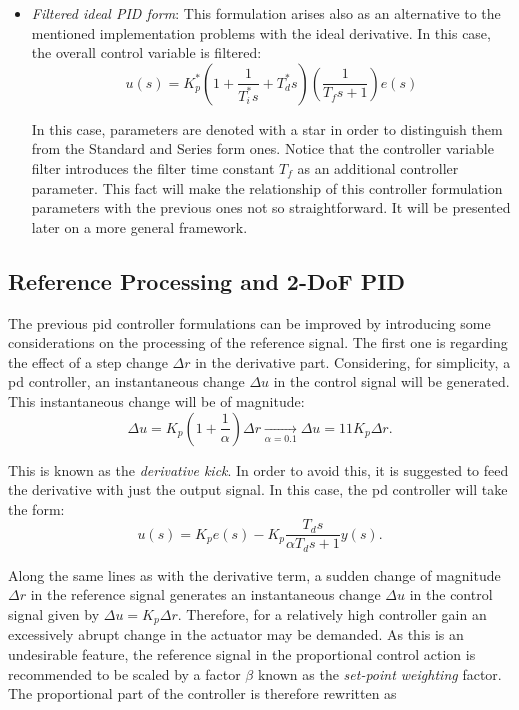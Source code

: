 \begin{itemize}
\item \emph{Filtered ideal PID form}: This formulation arises also as an alternative to the mentioned implementation problems with the ideal derivative. In this case, the overall control variable is filtered:
%
\begin{equation}
	u(s) =  K^*_p \left(1+ \frac{1}{T^*_i s} + T^*_d s  \right) \left(\frac{1}{T_f s+1}\right) e(s)	
\end{equation} 

In this case, parameters are denoted with a star in order to distinguish them from the Standard and Series form ones. Notice that the controller variable filter introduces the filter time constant $T_f$ as an additional controller parameter. This fact will make the relationship of this controller formulation parameters with the previous ones not so straightforward. It will be presented later on a more general framework. 
\end{itemize}
%
\subsection{Reference Processing and 2-DoF PID}
\label{sec:3.2}
The previous \gls{pid} controller formulations can be improved by introducing some considerations on the processing of the reference signal. The first one is regarding the effect of a step change $\Delta r$ in the derivative part. Considering, for simplicity, a \gls{pd} controller, an instantaneous change $\Delta u$ in the control signal will be generated. This instantaneous change will be of magnitude:
%
\begin{equation}
\Delta u = K_p \left ( 1 +\frac{1}{\alpha} \right ) \Delta r \xrightarrow[\alpha=0.1]{}\Delta u = 11 K_p \Delta r.
\end{equation} 

This is known as the \emph{derivative kick}. In order to avoid this, it is suggested to feed the derivative with just the output signal.  In this case, the \gls{pd} controller will take the form:
%
\begin{equation}
u(s)=K_p e(s) - K_p\frac{T_ds}{\alpha T_d s+1} y(s).
\end{equation}

Along the same lines as with the derivative term, a sudden change of magnitude $\Delta r$ in the reference signal generates an instantaneous change $\Delta u$ in the control signal given by $\Delta u = K_p \Delta r$. Therefore, for a relatively high controller gain an excessively abrupt change in the actuator may be demanded. As this is an undesirable feature, the reference signal in the proportional control action is recommended to be scaled by a factor $\beta$ known as the \emph{set-point weighting} factor. The proportional part of the controller is therefore rewritten as

